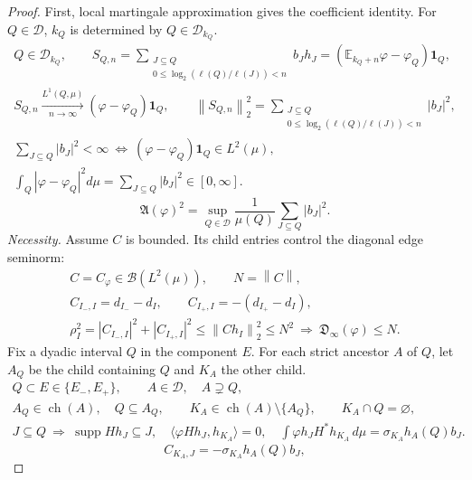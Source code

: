\documentclass[11pt]{amsart}
\newcommand{\D}{\mathcal D}
\newcommand{\supp}{\operatorname{supp}}
\newcommand{\ip}[2]{\langle #1,#2\rangle}
\newcommand{\norm}[1]{\left\|#1\right\|}
\newcommand{\ch}{\operatorname{ch}}
\begin{document}
\begin{proof}
First, local martingale approximation gives the coefficient identity.
For $Q\in\D$, $k_Q$ is determined by $Q\in\D_{k_Q}$.
\begin{gather*}
 Q\in\D_{k_Q},\qquad
 S_{Q,n}=\sum_{\substack{J\subseteq Q\\
             0\le\log_2(\ell(Q)/\ell(J))<n}}b_Jh_J
       =(\mathbb E_{k_Q+n}\varphi-\varphi_Q)\mathbf1_Q,\\
 S_{Q,n}\xrightarrow[n\to\infty]{L^1(Q,\mu)}
                       (\varphi-\varphi_Q)\mathbf1_Q,\qquad
 \norm{S_{Q,n}}_2^2
       =\sum_{\substack{J\subseteq Q\\
             0\le\log_2(\ell(Q)/\ell(J))<n}}|b_J|^2,\\
 \sum_{J\subseteq Q}|b_J|^2<\infty
 \ \Longleftrightarrow\
 (\varphi-\varphi_Q)\mathbf1_Q\in L^2(\mu),\\
 \int_Q|\varphi-\varphi_Q|^2d\mu
                   =\sum_{J\subseteq Q}|b_J|^2\in[0,\infty].
\end{gather*}
\begin{equation}\label{carleson-local}
 \mathfrak A(\varphi)^2
   =\sup_{Q\in\D}\frac1{\mu(Q)}\sum_{J\subseteq Q}|b_J|^2.
\end{equation}
\emph{Necessity.} Assume $C$ is bounded. Its child entries control
the diagonal edge seminorm:
\begin{gather*}
 C=C_\varphi\in\mathcal B(L^2(\mu)),\qquad N=\norm C,\\
 C_{I_-,I}=d_{I_-}-d_I,\qquad
 C_{I_+,I}=-(d_{I_+}-d_I),\\
 \rho_I^2=|C_{I_-,I}|^2+|C_{I_+,I}|^2
       \le\norm{Ch_I}_2^2\le N^2
 \ \Longrightarrow\ \mathfrak D_\infty(\varphi)\le N.
\end{gather*}
Fix a dyadic interval $Q$ in the component $E$. For each strict
ancestor $A$ of $Q$, let $A_Q$ be the child containing $Q$ and $K_A$
the other child.
\begin{gather*}
 Q\subset E\in\{E_-,E_+\},\qquad A\in\D,\quad A\supsetneq Q,\\
 A_Q\in\ch(A),\quad Q\subseteq A_Q,\qquad
 K_A\in\ch(A)\setminus\{A_Q\},\qquad K_A\cap Q=\varnothing,\\
 J\subseteq Q\ \Longrightarrow\
 \supp Hh_J\subseteq J,\quad
 \ip{\varphi Hh_J}{h_{K_A}}=0,\quad
 \int\varphi h_JH^*h_{K_A}\,d\mu
                  =\sigma_{K_A}h_A(Q)b_J.
\end{gather*}
\begin{equation}\label{outside-entry}
 C_{K_A,J}=-\sigma_{K_A}h_A(Q)b_J,

\end{equation}
\end{proof}
\end{document}
